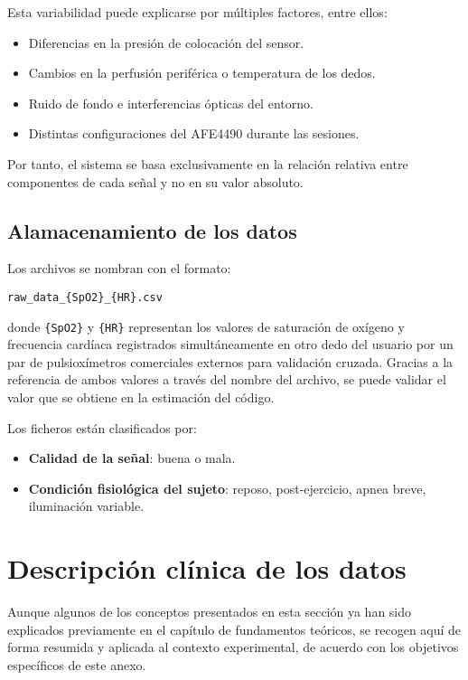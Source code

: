Esta variabilidad puede explicarse por múltiples factores, entre ellos:

\begin{itemize}
    \item Diferencias en la presión de colocación del sensor.
    \item Cambios en la perfusión periférica o temperatura de los dedos.
    \item Ruido de fondo e interferencias ópticas del entorno.
    \item Distintas configuraciones del AFE4490 durante las sesiones.
\end{itemize}

Por tanto, el sistema se basa exclusivamente en la relación relativa entre componentes de cada señal y no en su valor absoluto.

\subsection{Alamacenamiento de los datos}

Los archivos se nombran con el formato:

\begin{center}
  \texttt{raw\_data\_\{SpO2\}\_\{HR\}.csv}
\end{center}

donde \texttt{\{SpO2\}} y \texttt{\{HR\}} representan los valores de saturación de oxígeno y frecuencia cardíaca registrados simultáneamente en otro dedo del usuario por un par de pulsioxímetros comerciales externos para validación cruzada. Gracias a la referencia de ambos valores a través del nombre del archivo, se puede validar el valor que se obtiene en la estimación del código.

Los ficheros están clasificados por:

\begin{itemize}
  \item \textbf{Calidad de la señal}: buena o mala.
  \item \textbf{Condición fisiológica del sujeto}: reposo, post-ejercicio, apnea breve, iluminación variable.
\end{itemize}

\section{Descripción clínica de los datos}

Aunque algunos de los conceptos presentados en esta sección ya han sido explicados previamente en el capítulo de fundamentos teóricos, se recogen aquí de forma resumida y aplicada al contexto experimental, de acuerdo con los objetivos específicos de este anexo.


